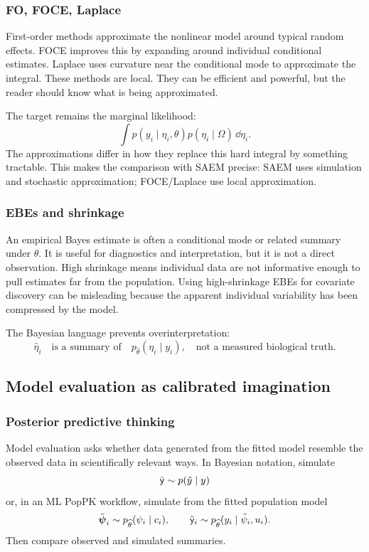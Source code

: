 \subsubsection*{FO, FOCE, Laplace}

First-order methods approximate the nonlinear model around typical random effects.  FOCE improves this by expanding around individual conditional estimates.  Laplace uses curvature near the conditional mode to approximate the integral.  These methods are local.  They can be efficient and powerful, but the reader should know what is being approximated.

The target remains the marginal likelihood:
\[
  \int p(y_i\mid\eta_i,\theta)p(\eta_i\mid\Omega)\,\dd\eta_i.
\]
The approximations differ in how they replace this hard integral by something tractable.  This makes the comparison with SAEM precise: SAEM uses simulation and stochastic approximation; FOCE/Laplace use local approximation.

\subsubsection*{EBEs and shrinkage}

An empirical Bayes estimate is often a conditional mode or related summary under \(\widehat\theta\).  It is useful for diagnostics and interpretation, but it is not a direct observation.  High shrinkage means individual data are not informative enough to pull estimates far from the population.  Using high-shrinkage EBEs for covariate discovery can be misleading because the apparent individual variability has been compressed by the model.

The Bayesian language prevents overinterpretation:
\[
  \widehat\eta_i
  \quad\text{is a summary of}\quad
  p_{\widehat\theta}(\eta_i\mid y_i),
  \quad\text{not a measured biological truth.}
\]

\subsection{Model evaluation as calibrated imagination}

\subsubsection*{Posterior predictive thinking}

Model evaluation asks whether data generated from the fitted model resemble the observed data in scientifically relevant ways.  In Bayesian notation, simulate
\[
  \tilde{\mathsf{y}}\sim p(\tilde y\mid y)
\]
or, in an ML PopPK workflow, simulate from the fitted population model
\[
  \tilde{\boldsymbol{\psi}}_i\sim p_{\widehat\theta}(\psi_i\mid c_i),
  \qquad
  \tilde{\mathsf{y}}_i\sim p_{\widehat\theta}(y_i\mid \tilde\psi_i,u_i).
\]
Then compare observed and simulated summaries.

